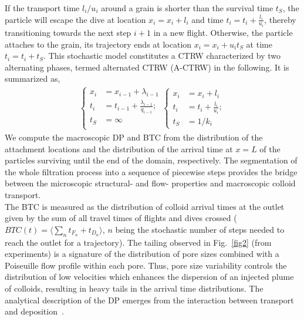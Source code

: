 \documentclass[singlecolumn,pre,notitlepage,preprintnumbers,floatfix,superscriptaddress]{revtex4-1}
\begin{document}
\noindent
If the transport time $l_i /u_i$ around a grain is shorter than the survival time $t_S$, the particle will escape the dive at location $x_i = x_{i} + l_{i}$ and time $t_i =t_{i} + \frac{l_{i}}{u_{i}}$, thereby transitioning towards the next step $i+1$ in a new flight. Otherwise, the particle attaches to the grain, its trajectory ends at location $x_i = x_i + u_{i} t_S$ at time $t_i = t_{i} + t_S$. This stochastic model constitutes a CTRW characterized by two alternating phases, termed alternated CTRW (A-CTRW) in the following. It is summarized as,
%
\begin{equation}
\begin{split}
 \left\{ \begin{array}{llll}
	x_i & = x_{i-1} + \lambda_{i-1} \\
	t_i & = t_{i-1} + \frac{\lambda_{i-1}}{q_{i-1}};\\
	t_S & = \infty \\
\end{array} \right.
\left\{ \begin{array}{ll}
	x_i & = x_{i} + l_{i} \\
	t_i & = t_{i} + \frac{l_{i}}{u_{i}};\\
	t_S & = 1/k_i
\end{array} \right.
\end{split}
\label{eq:CTRW}
\end{equation}
%
We compute the macroscopic DP and BTC from the distribution of the attachment locations and the distribution of the arrival time at $x = L$ of the particles surviving until the end of the domain, respectively. The segmentation of the whole filtration process into a sequence of piecewise steps provides the bridge between the microscopic structural- and flow- properties and macroscopic colloid transport. \\

\noindent
The BTC is measured as the distribution of colloid arrival times at the outlet given by the sum of all travel times of flights and dives crossed ($BTC(t)=\langle \sum_n t_{F_n} + t_{D_n}\rangle$, $n$ being the stochastic number of steps needed to reach the outlet for a trajectory). The tailing observed in Fig.~\ref{fig2} (from experiments) is a signature of the distribution of pore sizes combined with a Poiseuille flow profile within each pore. Thus, pore size variability controls the distribution of low velocities which enhances the dispersion of an injected plume of colloids, resulting in heavy tails in the arrival time distributions. The analytical description of the DP emerges from the interaction between transport and deposition~\cite{miele_stochastic_2019}. \\ 
\end{document}
